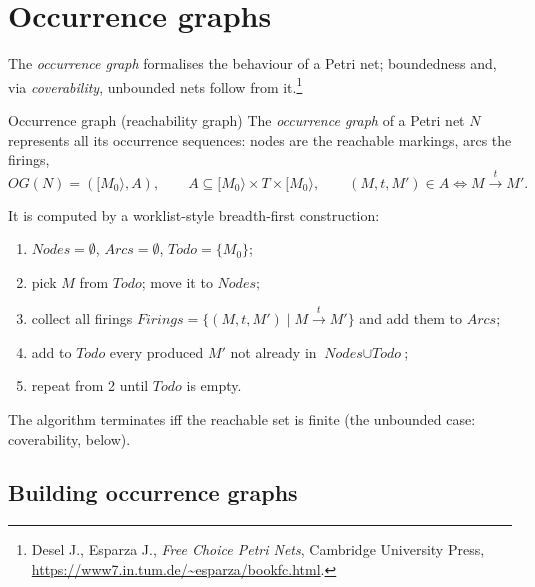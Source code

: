 \section{Occurrence graphs}

The \emph{occurrence graph} formalises the behaviour of a Petri net; boundedness and, via \emph{coverability}, unbounded nets follow from it.\footnote{Desel J., Esparza J., \emph{Free Choice Petri Nets}, Cambridge University Press, \url{https://www7.in.tum.de/~esparza/bookfc.html}.}

\begin{definitionbox}{Occurrence graph (reachability graph)}
The \emph{occurrence graph} of a Petri net $N$ represents all its occurrence sequences: nodes are the reachable markings, arcs the firings,
\[
  OG(N) = ([M_0\rangle, A), \qquad A \subseteq [M_0\rangle \times T \times [M_0\rangle, \qquad (M, t, M') \in A \iff M \xrightarrow{t} M'.
\]
\end{definitionbox}

It is computed by a worklist-style breadth-first construction:
\begin{enumerate}
  \item $\textit{Nodes} = \emptyset$, $\textit{Arcs} = \emptyset$, $\textit{Todo} = \{M_0\}$;
  \item pick $M$ from $\textit{Todo}$; move it to $\textit{Nodes}$;
  \item collect all firings $\textit{Firings} = \{(M, t, M') \mid M \xrightarrow{t} M'\}$ and add them to $\textit{Arcs}$;
  \item add to $\textit{Todo}$ every produced $M'$ not already in $\textit{Nodes} \cup \textit{Todo}$;
  \item repeat from 2 until $\textit{Todo}$ is empty.
\end{enumerate}
The algorithm terminates iff the reachable set is finite (the unbounded case: coverability, below).

\subsection{Building occurrence graphs}

